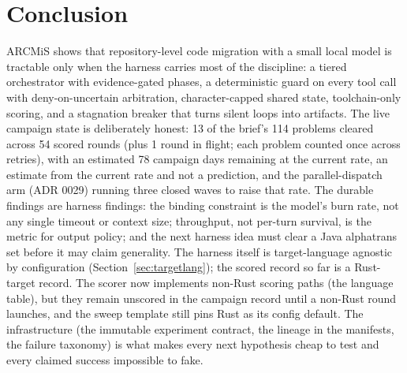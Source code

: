 \documentclass[11pt]{article}
\begin{document}
\section{Conclusion}

ARCMiS shows that repository-level code migration with a small local
model is tractable only when the harness carries most of the discipline:
a tiered orchestrator with evidence-gated phases, a deterministic guard
on every tool call with deny-on-uncertain arbitration, character-capped
shared state, toolchain-only scoring, and a stagnation breaker that turns
silent loops into artifacts. The live campaign state is deliberately
honest: 13 of the brief's 114 problems cleared across 54 scored rounds
(plus 1 round in flight; each problem counted once across retries),
with an estimated 78
campaign days remaining at the current rate, an estimate from the
current rate and not a prediction, and the parallel-dispatch arm
(ADR 0029) running three closed waves to raise that rate. The durable findings
are harness findings: the binding constraint is the model's burn rate,
not any single timeout or context size; throughput, not per-turn
survival, is the metric for output policy; and the next harness idea
must clear a Java alphatrans set before it may claim generality. The
harness itself is target-language agnostic by configuration
(Section~\ref{sec:targetlang}); the scored record so far is a
Rust-target record. The scorer now implements non-Rust scoring paths
(the language table), but they remain unscored in the campaign record
until a non-Rust round launches, and the sweep template still pins Rust
as its config default. The
infrastructure (the immutable experiment contract, the lineage in the
manifests, the failure taxonomy) is what makes every next hypothesis
cheap to test and every claimed success impossible to fake.



\end{document}
